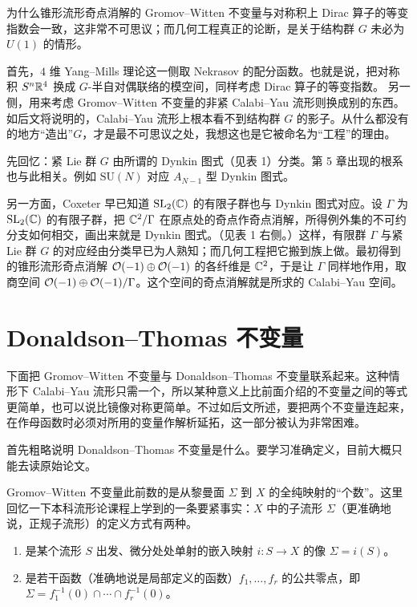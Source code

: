 为什么锥形流形奇点消解的 Gromov--Witten 不变量与对称积上 Dirac 算子的等变指数会一致，这非常不可思议；而几何工程真正的论断，是关于结构群 $G$ 未必为 $U(1)$ 的情形。

首先，$4$ 维 Yang--Mills 理论这一侧取 Nekrasov 的配分函数。也就是说，把对称积 $S^n\mathbb{R}^4$ 换成 $G$-半自对偶联络的模空间，同样考虑 Dirac 算子的等变指数。
另一侧，用来考虑 Gromov--Witten 不变量的非紧 Calabi--Yau 流形则换成别的东西。如后文将说明的，Calabi--Yau 流形上根本看不到结构群 $G$ 的影子。从什么都没有的地方“造出”$G$，才是最不可思议之处，我想这也是它被命名为“工程”的理由。

先回忆：紧 Lie 群 $G$ 由所谓的 Dynkin 图式（见表 1）分类。第 5 章出现的根系也与此相关。例如 $\mathrm{SU}(N)$ 对应 $A_{N-1}$ 型 Dynkin 图式。

另一方面，Coxeter 早已知道 $\mathrm{SL}_2(\mathbb{C})$ 的有限子群也与 Dynkin 图式对应。设 $\Gamma$ 为 $\mathrm{SL}_2(\mathbb{C})$ 的有限子群，把 $\mathbb{C}^2/\Gamma$ 在原点处的奇点作奇点消解，所得例外集的不可约分支如何相交，画出来就是 Dynkin 图式。（见表 1 右侧。）这样，有限群 $\Gamma$ 与紧 Lie 群 $G$ 的对应经由分类早已为人熟知；而几何工程把它搬到族上做。最初得到的锥形流形奇点消解 $\mathcal{O}(-1)\oplus\mathcal{O}(-1)$ 的各纤维是 $\mathbb{C}^2$，于是让 $\Gamma$ 同样地作用，取商空间 $\mathcal{O}(-1)\oplus\mathcal{O}(-1)/\Gamma$。这个空间的奇点消解就是所求的 Calabi--Yau 空间。

\section{Donaldson--Thomas 不变量}

下面把 Gromov--Witten 不变量与 Donaldson--Thomas 不变量联系起来。这种情形下 Calabi--Yau 流形只需一个，所以某种意义上比前面介绍的不变量之间的等式更简单，也可以说比镜像对称更简单。不过如后文所述，要把两个不变量连起来，在作母函数时必须对所用的变量作解析延拓，这一部分被认为非常困难。

首先粗略说明 Donaldson--Thomas 不变量是什么。要学习准确定义，目前大概只能去读原始论文。

Gromov--Witten 不变量此前数的是从黎曼面 $\Sigma$ 到 $X$ 的全纯映射的“个数”。这里回忆一下本科流形论课程上学到的一条要紧事实：$X$ 中的子流形 $\Sigma$（更准确地说，正规子流形）的定义方式有两种。

\begin{enumerate}[label=\arabic*),leftmargin=2.2em]
\item 是某个流形 $S$ 出发、微分处处单射的嵌入映射 $i:S\to X$ 的像 $\Sigma=i(S)$。
\item 是若干函数（准确地说是局部定义的函数）$f_1,\dots,f_r$ 的公共零点，即 $\Sigma=f_1^{-1}(0)\cap\cdots\cap f_r^{-1}(0)$。
\end{enumerate}

